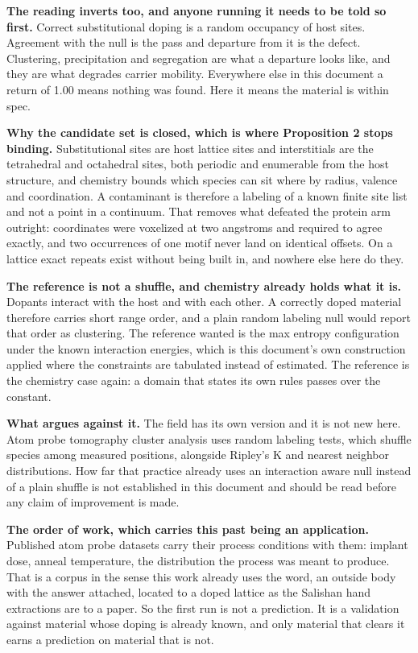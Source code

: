 \textbf{The reading inverts too, and anyone running it needs to be told so first.} Correct substitutional doping is a random occupancy of host sites. Agreement with the null is the pass and departure from it is the defect. Clustering, precipitation and segregation are what a departure looks like, and they are what degrades carrier mobility. Everywhere else in this document a return of 1.00 means nothing was found. Here it means the material is within spec.

\textbf{Why the candidate set is closed, which is where Proposition 2 stops binding.} Substitutional sites are host lattice sites and interstitials are the tetrahedral and octahedral sites, both periodic and enumerable from the host structure, and chemistry bounds which species can sit where by radius, valence and coordination. A contaminant is therefore a labeling of a known finite site list and not a point in a continuum. That removes what defeated the protein arm outright: coordinates were voxelized at two angstroms and required to agree exactly, and two occurrences of one motif never land on identical offsets. On a lattice exact repeats exist without being built in, and nowhere else here do they.

\textbf{The reference is not a shuffle, and chemistry already holds what it is.} Dopants interact with the host and with each other. A correctly doped material therefore carries short range order, and a plain random labeling null would report that order as clustering. The reference wanted is the max entropy configuration under the known interaction energies, which is this document's own construction applied where the constraints are tabulated instead of estimated. The reference is the chemistry case again: a domain that states its own rules passes over the constant.

\textbf{What argues against it.} The field has its own version and it is not new here. Atom probe tomography cluster analysis uses random labeling tests, which shuffle species among measured positions, alongside Ripley's K and nearest neighbor distributions. How far that practice already uses an interaction aware null instead of a plain shuffle is not established in this document and should be read before any claim of improvement is made.

\textbf{The order of work, which carries this past being an application.} Published atom probe datasets carry their process conditions with them: implant dose, anneal temperature, the distribution the process was meant to produce. That is a corpus in the sense this work already uses the word, an outside body with the answer attached, located to a doped lattice as the Salishan hand extractions are to a paper. So the first run is not a prediction. It is a validation against material whose doping is already known, and only material that clears it earns a prediction on material that is not.

